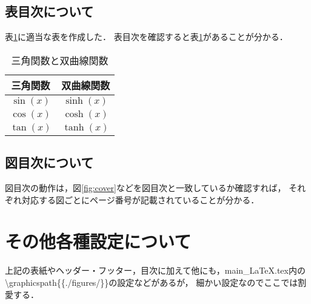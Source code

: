 \subsection{表目次について}
表\ref{tab:triangle}に適当な表を作成した．
表目次を確認すると表\ref{tab:triangle}があることが分かる．

\begin{table}[htbp]
  \centering
  \caption{三角関数と双曲線関数}
  \begin{tabular}{cc} \hline 
    三角関数 & 双曲線関数 \\ \hline
    $\sin(x)$ & $\sinh(x)$ \\
    $\cos(x)$ & $\cosh(x)$ \\
    $\tan(x)$ & $\tanh(x)$ \\ \hline
  \end{tabular}
  \label{tab:triangle}
\end{table}


\subsection{図目次について}
図目次の動作は，図\ref{fig:cover}などを図目次と一致しているか確認すれば，
それぞれ対応する図ごとにページ番号が記載されていることが分かる．


\section{その他各種設定について}
上記の表紙やヘッダー・フッター，目次に加えて他にも，main\_LaTeX.tex内の
\textbackslash graphicspath\{\{./figures/\}\}の設定などがあるが，
細かい設定なのでここでは割愛する．
